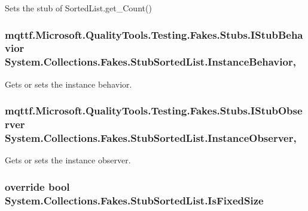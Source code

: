 Sets the stub of Sorted\-List.\-get\-\_\-\-Count()

\hypertarget{class_system_1_1_collections_1_1_fakes_1_1_stub_sorted_list_a5c145c7675d3203450ba05f9276fd6b3}{
\subsubsection[{Instance\-Behavior}]{\setlength{\rightskip}{0pt plus 5cm}mqttf.\-Microsoft.\-Quality\-Tools.\-Testing.\-Fakes.\-Stubs.\-I\-Stub\-Behavior System.\-Collections.\-Fakes.\-Stub\-Sorted\-List.\-Instance\-Behavior\hspace{0.3cm}{\ttfamily [get]}, {\ttfamily [set]}}}\label{class_system_1_1_collections_1_1_fakes_1_1_stub_sorted_list_a5c145c7675d3203450ba05f9276fd6b3}


Gets or sets the instance behavior.

\hypertarget{class_system_1_1_collections_1_1_fakes_1_1_stub_sorted_list_a949bae85d5948e4646e5edbbbec21067}{
\subsubsection[{Instance\-Observer}]{\setlength{\rightskip}{0pt plus 5cm}mqttf.\-Microsoft.\-Quality\-Tools.\-Testing.\-Fakes.\-Stubs.\-I\-Stub\-Observer System.\-Collections.\-Fakes.\-Stub\-Sorted\-List.\-Instance\-Observer\hspace{0.3cm}{\ttfamily [get]}, {\ttfamily [set]}}}\label{class_system_1_1_collections_1_1_fakes_1_1_stub_sorted_list_a949bae85d5948e4646e5edbbbec21067}


Gets or sets the instance observer.

\hypertarget{class_system_1_1_collections_1_1_fakes_1_1_stub_sorted_list_ad7574eee6ea3a38f43f1b4e82e93734f}{
\subsubsection[{Is\-Fixed\-Size}]{\setlength{\rightskip}{0pt plus 5cm}override bool System.\-Collections.\-Fakes.\-Stub\-Sorted\-List.\-Is\-Fixed\-Size\hspace{0.3cm}{\ttfamily [get]}}}\label{class_system_1_1_collections_1_1_fakes_1_1_stub_sorted_list_ad7574eee6ea3a38f43f1b4e82e93734f}


